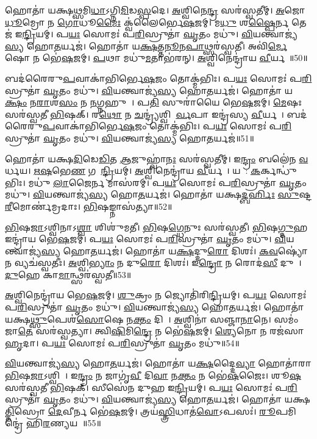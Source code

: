 𑌹𑍋𑌤𑌾॑ 𑌯𑌕𑍍𑌷\ul{𑌥𑍍𑌸}𑌮𑌿\ul{𑌧𑌾}\-𑌽𑌗𑍍𑌨𑌿\ul{𑌮𑌿}𑌡\ul{𑌸𑍍𑌪}𑌦𑍇।
\ul{𑌅}𑌶𑍍𑌵𑌿𑌨𑍇\ul{𑌨𑍍𑌦𑍍𑌰}\ul{} 𑌸𑌰॑𑌸𑍍𑌵𑌤𑍀𑌮𑍍।
\ul{𑌅}𑌜𑍋 \ul{𑌧𑍂}𑌮𑍍𑌰𑍋 𑌨 \ul{𑌗𑍋}𑌧𑍂\ul{𑌮𑍈𑌃} 𑌕𑍍𑌵॑𑌲𑍈𑌰𑍍𑌭𑍇\ul{𑌷}𑌜𑌮𑍍।
𑌮\ul{𑌧𑍁} 𑌶\ul{𑌷𑍍𑌪𑍈}𑌰𑍍𑌨 𑌤𑍇𑌜॑ 𑌇\ul{𑌨𑍍𑌦𑍍𑌰𑌿}𑌯𑌮𑍍।
𑌪\ul{𑌯𑌃} 𑌸𑍋𑌮𑌃॑ 𑌪\ul{𑌰𑌿}𑌸𑍍𑌰𑍁𑌤𑌾॑ \ul{𑌘𑍃}𑌤𑌂 𑌮𑌧𑍁॑।
\ul{𑌵𑌿}𑌯𑌨𑍍𑌤𑍍𑌵𑌾𑌜𑍍𑌯॑\ul{𑌸𑍍𑌯} 𑌹𑍋\ul{𑌤}𑌰𑍍𑌯𑌜॑।
𑌹𑍋𑌤𑌾॑ 𑌯\ul{𑌕𑍍𑌷}𑌤𑍍𑌤\ul{𑌨𑍂}𑌨\ul{𑌪𑌾}𑌥𑍍𑌸𑌰॑𑌸𑍍𑌵𑌤𑍀।
𑌅𑌵𑌿॑\ul{𑌰𑍍𑌮𑍇}𑌷𑍋 𑌨 𑌭𑍇॑\ul{𑌷}𑌜𑌮𑍍।
\ul{𑌪}𑌥𑌾 𑌮𑌧𑍁॑\ul{𑌮}𑌤𑌾𑌭॑𑌰𑌨𑍍।
\ul{𑌅}𑌶𑍍𑌵𑌿𑌨𑍇𑌨𑍍𑌦𑍍𑌰𑌾॑𑌯 \ul{𑌵𑍀}𑌰𑍍𑌯𑌮𑍍᳚॥50॥

𑌬𑌦॑𑌰𑍈𑌰𑍁\ul{𑌪}𑌵𑌾𑌕𑌾॑𑌭𑌿𑌰𑍍𑌭𑍇\ul{𑌷}𑌜𑌂 𑌤𑍋𑌕𑍍𑌮॑𑌭𑌿𑌃।
𑌪\ul{𑌯𑌃} 𑌸𑍋𑌮𑌃॑ 𑌪\ul{𑌰𑌿}𑌸𑍍𑌰𑍁𑌤𑌾॑ \ul{𑌘𑍃}𑌤𑌂 𑌮𑌧𑍁॑।
\ul{𑌵𑌿}𑌯𑌨𑍍𑌤𑍍𑌵𑌾𑌜𑍍𑌯॑\ul{𑌸𑍍𑌯} 𑌹𑍋\ul{𑌤}𑌰𑍍𑌯𑌜॑।
𑌹𑍋𑌤𑌾॑ 𑌯\ul{𑌕𑍍𑌷𑌂} 𑌨\ul{𑌰𑌾}𑌶\ul{𑌸𑌂} 𑌨 \ul{𑌨}𑌗𑍍𑌨𑌹𑍁𑌮𑍍᳚।
𑌪\ul{𑌤𑌿}\ul{} 𑌸𑍁𑌰𑌾॑𑌯𑍈 𑌭𑍇\ul{𑌷}𑌜𑌮𑍍।
\ul{𑌮𑍇}𑌷𑌃 𑌸𑌰॑𑌸𑍍𑌵𑌤𑍀 \ul{𑌭𑌿}𑌷𑌕𑍍।
𑌰\ul{𑌥𑍋} 𑌨 \ul{𑌚}𑌨𑍍𑌦𑍍𑌰𑍍𑌯॑𑌶𑍍𑌵𑌿𑌨𑍋᳚\ul{𑌰𑍍𑌵}𑌪𑌾 𑌇𑌨𑍍𑌦𑍍𑌰॑𑌸𑍍𑌯 \ul{𑌵𑍀}𑌰𑍍𑌯𑌮𑍍᳚।
𑌬𑌦॑𑌰𑍈𑌰𑍁\ul{𑌪}𑌵𑌾𑌕𑌾॑𑌭𑌿𑌰𑍍𑌭𑍇\ul{𑌷}𑌜𑌂 𑌤𑍋𑌕𑍍𑌮॑𑌭𑌿𑌃।
𑌪\ul{𑌯𑌃} 𑌸𑍋𑌮𑌃॑ 𑌪\ul{𑌰𑌿}𑌸𑍍𑌰𑍁𑌤𑌾॑ \ul{𑌘𑍃}𑌤𑌂 𑌮𑌧𑍁॑।
\ul{𑌵𑌿}𑌯𑌨𑍍𑌤𑍍𑌵𑌾𑌜𑍍𑌯॑\ul{𑌸𑍍𑌯} 𑌹𑍋\ul{𑌤}𑌰𑍍𑌯𑌜॑॥51॥

𑌹𑍋𑌤𑌾॑ 𑌯𑌕𑍍𑌷\ul{𑌦𑌿}𑌡𑍇\ul{𑌡𑌿}𑌤 \ul{𑌆}𑌜𑍁𑌹𑍍𑌵𑌾॑\ul{𑌨𑌃} 𑌸𑌰॑𑌸𑍍𑌵𑌤𑍀𑌮𑍍।
𑌇\ul{𑌨𑍍𑌦𑍍𑌰𑌂} 𑌬𑌲𑍇॑𑌨 \ul{𑌵}𑌰𑍍𑌧𑌯\sn{}।
\ul{𑌋}\ul{𑌷}𑌭𑍇\ul{𑌣} 𑌗𑌵𑍇᳚\ul{𑌨𑍍𑌦𑍍𑌰𑌿}𑌯𑌮𑍍।
\ul{𑌅}𑌶𑍍𑌵𑌿𑌨𑍇𑌨𑍍𑌦𑍍𑌰𑌾॑𑌯 \ul{𑌵𑍀}𑌰𑍍𑌯𑌮𑍍᳚।
𑌯𑌵𑍈᳚: \ul{𑌕}𑌰𑍍𑌕𑌨𑍍𑌧𑍁॑𑌭𑌿𑌃।
𑌮𑌧𑍁॑ \ul{𑌲𑌾}𑌜𑍈𑌰𑍍𑌨 𑌮𑌾𑌸॑𑌰𑌮𑍍।
𑌪\ul{𑌯𑌃} 𑌸𑍋𑌮𑌃॑ 𑌪\ul{𑌰𑌿}𑌸𑍍𑌰𑍁𑌤𑌾॑ \ul{𑌘𑍃}𑌤𑌂 𑌮𑌧𑍁॑।
\ul{𑌵𑌿}𑌯𑌨𑍍𑌤𑍍𑌵𑌾𑌜𑍍𑌯॑\ul{𑌸𑍍𑌯} 𑌹𑍋\ul{𑌤}𑌰𑍍𑌯𑌜॑।
𑌹𑍋𑌤𑌾॑ 𑌯𑌕𑍍𑌷\ul{𑌦𑍍𑌬}\ul{𑌰𑍍}𑌹𑌿𑌃 \ul{𑌸𑍁}𑌷𑍍𑌟\ul{𑌰𑍀}𑌮𑍋𑌰𑍍𑌣॑𑌮𑍍𑌰𑌦𑌾𑌃।
\ul{𑌭𑌿}𑌷𑌙𑍍𑌨𑌾𑌸॑𑌤𑍍𑌯𑌾॥52॥

\ul{𑌭𑌿}𑌷\ul{𑌜𑌾}\-𑌽𑌶𑍍𑌵𑌿𑌨𑌾\-𑌽\ul{𑌶𑍍𑌵𑌾} 𑌶𑌿𑌶𑍁॑𑌮𑌤𑍀।
\ul{𑌭𑌿}𑌷\ul{𑌗𑍍𑌧𑍇}𑌨𑍁𑌃 𑌸𑌰॑𑌸𑍍𑌵𑌤𑍀।
\ul{𑌭𑌿}𑌷\ul{𑌗𑍍𑌦𑍁}𑌹 𑌇𑌨𑍍𑌦𑍍𑌰𑌾॑𑌯 𑌭𑍇\ul{𑌷}𑌜𑌮𑍍।
𑌪\ul{𑌯𑌃} 𑌸𑍋𑌮𑌃॑ 𑌪\ul{𑌰𑌿}𑌸𑍍𑌰𑍁𑌤𑌾॑ \ul{𑌘𑍃}𑌤𑌂 𑌮𑌧𑍁॑।
\ul{𑌵𑌿}𑌯𑌨𑍍𑌤𑍍𑌵𑌾𑌜𑍍𑌯॑\ul{𑌸𑍍𑌯} 𑌹𑍋\ul{𑌤}𑌰𑍍𑌯𑌜॑।
𑌹𑍋𑌤𑌾॑ 𑌯\ul{𑌕𑍍𑌷}𑌦𑍍𑌦𑍁\ul{𑌰𑍋} 𑌦𑌿𑌶𑌃॑।
\ul{𑌕}\ul{𑌵}𑌷𑍍𑌯𑍋॑ 𑌨 𑌵𑍍𑌯𑌚॑𑌸𑍍𑌵𑌤𑍀𑌃।
\ul{𑌅}𑌶𑍍𑌵𑌿\ul{𑌭𑍍𑌯𑌾𑌂} 𑌨 𑌦𑍁\ul{𑌰𑍋} 𑌦𑌿𑌶𑌃॑।
𑌇\ul{𑌨𑍍𑌦𑍍𑌰𑍋} 𑌨 𑌰𑍋𑌦॑\ul{𑌸𑍀} 𑌦𑍁𑌘𑍇᳚।
\ul{𑌦𑍁}𑌹𑍇 𑌕𑌾\ul{𑌮𑌾}𑌨𑍍𑌥𑍍𑌸𑌰॑𑌸𑍍𑌵𑌤𑍀॥53॥

\ul{𑌅}𑌶𑍍𑌵𑌿𑌨𑍇𑌨𑍍𑌦𑍍𑌰𑌾॑𑌯 𑌭𑍇\ul{𑌷}𑌜𑌮𑍍।
\ul{𑌶𑍁}𑌕𑍍𑌰𑌂 𑌨 𑌜𑍍𑌯𑍋𑌤𑌿॑𑌰𑌿\ul{𑌨𑍍𑌦𑍍𑌰𑌿}𑌯𑌮𑍍।
𑌪\ul{𑌯𑌃} 𑌸𑍋𑌮𑌃॑ 𑌪\ul{𑌰𑌿}𑌸𑍍𑌰𑍁𑌤𑌾॑ \ul{𑌘𑍃}𑌤𑌂 𑌮𑌧𑍁॑।
\ul{𑌵𑌿}𑌯𑌨𑍍𑌤𑍍𑌵𑌾𑌜𑍍𑌯॑\ul{𑌸𑍍𑌯} 𑌹𑍋\ul{𑌤}𑌰𑍍𑌯𑌜॑।
𑌹𑍋𑌤𑌾॑ 𑌯𑌕𑍍𑌷\ul{𑌥𑍍𑌸𑍁}𑌪𑍇𑌶॑\ul{𑌸𑍋}𑌷𑍇 𑌨\ul{𑌕𑍍𑌤𑌂} 𑌦𑌿𑌵𑌾᳚।
\ul{𑌅}𑌶𑍍𑌵𑌿𑌨𑌾॑ 𑌸𑌞𑍍𑌜𑌾\ul{𑌨𑌾}𑌨𑍇।
𑌸𑌮𑌂॑ 𑌜𑌾\ul{𑌤𑍇} 𑌸𑌰॑𑌸𑍍𑌵𑌤𑍍𑌯𑌾।
𑌤𑍍𑌵𑌿\ul{𑌷𑌿}𑌮𑌿\ul{𑌨𑍍𑌦𑍍𑌰𑍇} 𑌨 𑌭𑍇॑\ul{𑌷}𑌜𑌮𑍍।
\ul{𑌶𑍍𑌯𑍇}𑌨𑍋 𑌨 𑌰𑌜॑𑌸𑌾 \ul{𑌹𑍃}𑌦𑌾।
𑌪\ul{𑌯𑌃} 𑌸𑍋𑌮𑌃॑ 𑌪\ul{𑌰𑌿}𑌸𑍍𑌰𑍁𑌤𑌾॑ \ul{𑌘𑍃}𑌤𑌂 𑌮𑌧𑍁॑॥54॥

\ul{𑌵𑌿}𑌯𑌨𑍍𑌤𑍍𑌵𑌾𑌜𑍍𑌯॑\ul{𑌸𑍍𑌯} 𑌹𑍋\ul{𑌤}𑌰𑍍𑌯𑌜॑।
𑌹𑍋𑌤𑌾॑ 𑌯\ul{𑌕𑍍𑌷}𑌦𑍍𑌦𑍈\ul{𑌵𑍍𑌯𑌾} 𑌹𑍋𑌤𑌾॑𑌰𑌾 \ul{𑌭𑌿}𑌷\ul{𑌜𑌾}\-𑌽𑌶𑍍𑌵𑌿𑌨𑌾᳚।
𑌇\ul{𑌨𑍍𑌦𑍍𑌰𑌂} 𑌨 𑌜𑌾𑌗𑍃॑\ul{𑌵𑍀} 𑌦𑌿\ul{𑌵𑌾} 𑌨\ul{𑌕𑍍𑌤𑌂} 𑌨 𑌭𑍇॑\ul{𑌷}𑌜𑍈𑌃।
𑌶𑍂\ul{𑌷}\ul{} 𑌸𑌰॑𑌸𑍍𑌵𑌤𑍀 \ul{𑌭𑌿}𑌷𑌕𑍍।
𑌸𑍀𑌸𑍇॑𑌨 𑌦𑍁𑌹 𑌇\ul{𑌨𑍍𑌦𑍍𑌰𑌿}𑌯𑌮𑍍।
𑌪\ul{𑌯𑌃} 𑌸𑍋𑌮𑌃॑ 𑌪\ul{𑌰𑌿}𑌸𑍍𑌰𑍁𑌤𑌾॑ \ul{𑌘𑍃}𑌤𑌂 𑌮𑌧𑍁॑।
\ul{𑌵𑌿}𑌯𑌨𑍍𑌤𑍍𑌵𑌾𑌜𑍍𑌯॑\ul{𑌸𑍍𑌯} 𑌹𑍋\ul{𑌤}𑌰𑍍𑌯𑌜॑।
𑌹𑍋𑌤𑌾॑ 𑌯𑌕𑍍𑌷\ul{𑌤𑍍𑌤𑌿}𑌸𑍍𑌰𑍋 \ul{𑌦𑍇}𑌵𑍀𑌰𑍍𑌨 𑌭𑍇॑\ul{𑌷}𑌜𑌮𑍍।
𑌤𑍍𑌰𑌯॑\ul{𑌸𑍍𑌤𑍍𑌰𑌿}𑌧𑌾𑌤॑\ul{𑌵𑍋}\-𑌽𑌪𑌸𑌃॑।
\ul{𑌰𑍂}𑌪𑌮𑌿𑌨𑍍𑌦𑍍𑌰𑍇॑ 𑌹𑌿\ul{𑌰}𑌣𑍍𑌯𑌯𑌮𑍍᳚॥55॥

